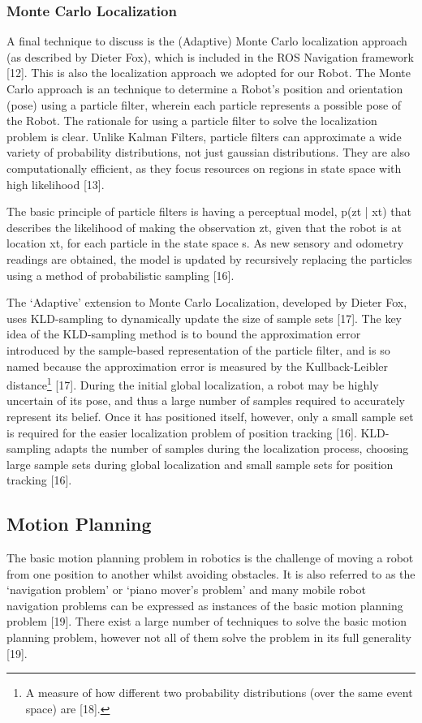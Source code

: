 \documentclass{article}
\begin{document}
\begin{multicols}{2}
	\subsubsection{Monte Carlo Localization}
	A final technique to discuss is the (Adaptive) Monte Carlo localization approach (as described by Dieter Fox),  which is included in the ROS Navigation framework [12]. This is also the localization approach we adopted for our Robot. The Monte Carlo approach is an technique to determine a Robot’s position and orientation (pose) using a particle filter,  wherein each particle represents a possible pose of the Robot. The rationale for using a  particle filter to solve the localization problem is clear. Unlike Kalman Filters, particle filters can approximate a wide variety of probability distributions, not just gaussian distributions. They are also computationally efficient, as they focus resources on regions in state space with high likelihood [13]. 

The basic principle of particle filters is having a perceptual model, p(zt | xt) that describes the likelihood of making the observation zt, given that the robot is at location xt, for each particle in the state space s. As new sensory and odometry readings are obtained, the model is updated by recursively replacing the particles using a method of probabilistic sampling [16].  

The ‘Adaptive’ extension to Monte Carlo Localization, developed by Dieter Fox, uses KLD-sampling to dynamically update the size of sample sets [17]. The key idea of the KLD-sampling method is to bound the approximation error introduced by the sample-based representation of the particle filter, and is so named because the approximation error is measured by the Kullback-Leibler distance\footnote{A measure of how different two probability distributions (over the same event space) are [18].} [17]. During the initial global localization, a robot may be highly uncertain of its pose, and thus a large number of samples required to accurately represent its belief. Once it has positioned itself, however, only a small sample set is required for the easier localization problem of position tracking [16]. KLD-sampling adapts the number of samples during the localization process, choosing large sample sets during global localization and small sample sets for position tracking [16].

	\subsection{Motion Planning}
	The basic motion planning problem in robotics is the challenge of moving a robot from one position to another whilst avoiding obstacles. It is also referred to as the ‘navigation problem’ or ‘piano mover’s problem’ and many mobile robot navigation problems can be expressed as instances of the basic motion planning problem [19]. There exist a large number of techniques to solve the basic motion planning problem, however not all of them solve the problem in its full generality [19]. 


\end{multicols}
\end{document}
